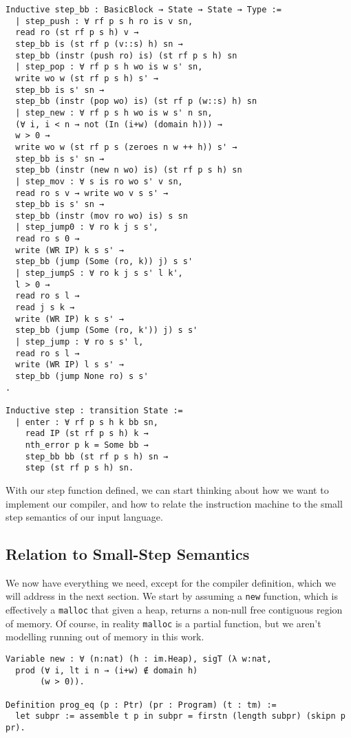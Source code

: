 \begin{verbatim}
Inductive step_bb : BasicBlock → State → State → Type := 
  | step_push : ∀ rf p s h ro is v sn,
  read ro (st rf p s h) v → 
  step_bb is (st rf p (v::s) h) sn → 
  step_bb (instr (push ro) is) (st rf p s h) sn
  | step_pop : ∀ rf p s h wo is w s' sn,
  write wo w (st rf p s h) s' → 
  step_bb is s' sn →
  step_bb (instr (pop wo) is) (st rf p (w::s) h) sn
  | step_new : ∀ rf p s h wo is w s' n sn,
  (∀ i, i < n → not (In (i+w) (domain h))) →
  w > 0 →
  write wo w (st rf p s (zeroes n w ++ h)) s' →
  step_bb is s' sn → 
  step_bb (instr (new n wo) is) (st rf p s h) sn 
  | step_mov : ∀ s is ro wo s' v sn, 
  read ro s v → write wo v s s' → 
  step_bb is s' sn → 
  step_bb (instr (mov ro wo) is) s sn
  | step_jump0 : ∀ ro k j s s', 
  read ro s 0 →
  write (WR IP) k s s' → 
  step_bb (jump (Some (ro, k)) j) s s'
  | step_jumpS : ∀ ro k j s s' l k', 
  l > 0 →
  read ro s l →
  read j s k → 
  write (WR IP) k s s' → 
  step_bb (jump (Some (ro, k')) j) s s'
  | step_jump : ∀ ro s s' l, 
  read ro s l →
  write (WR IP) l s s' → 
  step_bb (jump None ro) s s'
.

Inductive step : transition State :=
  | enter : ∀ rf p s h k bb sn,
    read IP (st rf p s h) k → 
    nth_error p k = Some bb → 
    step_bb bb (st rf p s h) sn →
    step (st rf p s h) sn.
\end{verbatim}

With our step function defined, we can start thinking about how we want to
implement our compiler, and how to relate the instruction machine to the small
step semantics of our input language.  

\subsection{Relation to Small-Step Semantics}

We now have everything we need, except for the compiler definition, which we
will address in the next section. We start by assuming a \texttt{new} function,
which is effectively a \texttt{malloc} that given a heap, returns a non-null
free contiguous region of memory. Of course, in reality \texttt{malloc} is a
partial function, but we aren't modelling running out of memory in this work. 

\begin{verbatim}
Variable new : ∀ (n:nat) (h : im.Heap), sigT (λ w:nat, 
  prod (∀ i, lt i n → (i+w) ∉ domain h)
       (w > 0)).

Definition prog_eq (p : Ptr) (pr : Program) (t : tm) := 
  let subpr := assemble t p in subpr = firstn (length subpr) (skipn p pr).
\end{verbatim}

